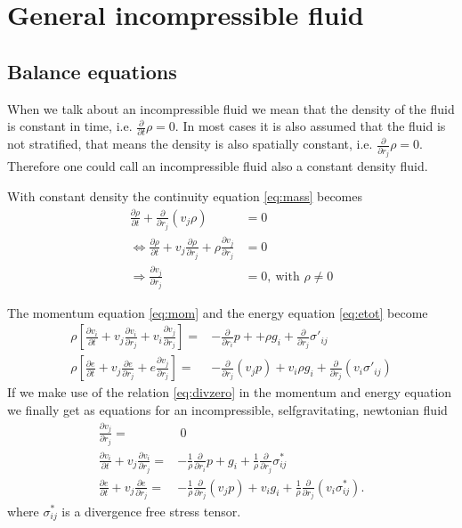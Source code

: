 \documentclass[a4paper,
					fontsize=12pt,
					twoside,
					pagesize,
					cleardoublepage=plain,
					headsepline,
					bibliography=totoc
					]{scrbook}
\newcommand{\lrb}[1]{{ \left[ #1 \right] }}
\newcommand{\pd}[1]{\frac{\partial}{\partial #1}}
\newcommand{\ppd}[2]{\frac{\partial #2}{\partial #1}}
\begin{document}
\chapter{General incompressible fluid}
\section{Balance equations}
When we talk about an incompressible fluid we mean that the density of the fluid
is constant in time, i.e. $\pd{t}\rho=0$. In most cases it is also assumed that 
the fluid is not stratified, that means the density is also spatially constant,
i.e. $\pd{r_j}\rho=0$. Therefore one could call an incompressible fluid also a
constant density fluid.

With constant density the continuity equation \eqref{eq:mass} becomes
\begin{align}
\ppd{t}{\rho} + \pd{r_j}(v_j \rho) &= 0 \\
\Leftrightarrow \ppd{t}{\rho}+ v_j \ppd{r_j}{\rho} + \rho \ppd{r_j}{v_j} &= 0\\
\Rightarrow \ppd{r_j}{v_j} &= 0,\ \text{with $\rho\neq 0$} \label{eq:divzero}
\end{align}

The momentum equation \eqref{eq:mom} and the energy equation
\eqref{eq:etot} 
become
\begin{align}
\rho \lrb{\ppd{t}{v_i} + v_j \ppd{r_j}{v_i} + v_i \ppd{r_j}{v_j}}  
=& -\pd{r_i}p + +\rho g_i+ \pd{r_j}\sigma'_{ij} \\
\rho \lrb{\ppd{t}{e} + v_j \ppd{r_j}{e} + e \ppd{r_j}{v_j}} 
=& -\pd{r_j}(v_j p) + v_i \rho g_i +\pd{r_j}(v_i \sigma'_{ij})
\end{align}
If we make use of the relation \eqref{eq:divzero} in the momentum and energy 
equation we finally get as equations for an incompressible, selfgravitating, 
newtonian fluid
\begin{align}
\ppd{r_j}{v_j} =&\ 0\\
\ppd{t}{v_i} + v_j \ppd{r_j}{v_i} =& -\frac{1}{\rho}\pd{r_i}p + g_i
+\frac{1}{\rho}\pd{r_j}\sigma^*_{ij}\\
\ppd{t}{e} + v_j \ppd{r_j}{e} =& -\frac{1}{\rho} \pd{r_j}(v_j p) + v_i g_i
+\frac{1}{\rho}\pd{r_j}(v_i \sigma^*_{ij}).
\end{align}
where $\sigma^*_{ij}$ is a divergence free stress tensor.
\end{document}
